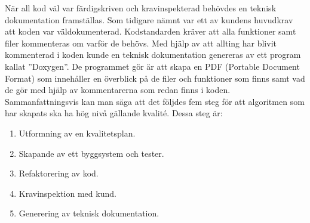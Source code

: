 \newline
\newline
När all kod väl var färdigskriven och kravinspekterad behövdes en teknisk dokumentation framställas. Som tidigare nämnt var ett av kundens huvudkrav att koden var väldokumenterad. Kodstandarden kräver att alla funktioner samt filer kommenteras om varför de behövs. Med hjälp av att allting har blivit kommenterad i koden kunde en teknisk dokumentation genereras av ett program kallat ''Doxygen''. De programmet gör är att skapa en PDF (Portable Document Format) som innehåller en överblick på de filer och funktioner som finns samt vad de gör med hjälp av kommentarerna som redan finns i koden.
\newline
\newline
Sammanfattningsvis kan man säga att det följdes fem steg för att algoritmen som har skapats ska ha hög nivå gällande kvalité. Dessa steg är:

\begin{enumerate}
\item{Utformning av en kvalitetsplan.}
\item{Skapande av ett byggsystem och tester.}
\item{Refaktorering av kod.}
\item{Kravinspektion med kund.}
\item{Generering av teknisk dokumentation.}
\end{enumerate}
 
